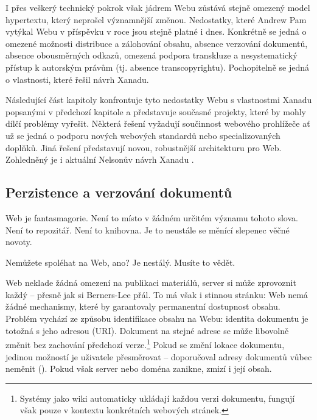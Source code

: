 I přes veškerý technický pokrok však jádrem Webu zůstává stejně omezený model hypertextu, který neprošel významnější změnou. Nedostatky, které Andrew Pam vytýkal Webu v příspěvku  v roce \cite*{Pam1995} jsou stejně platné i dnes. Konkrétně se jedná o omezené možnosti distribuce a zálohování obsahu, absence verzování dokumentů, absence obousměrných odkazů, omezená podpora transkluze a nesystematický přístup k autorským právům (tj. absence transcopyrightu). Pochopitelně se jedná o vlastnosti, které řešil návrh Xanadu.

Následující část kapitoly konfrontuje tyto nedostatky Webu s vlastnostmi Xanadu popsanými v předchozí kapitole  a představuje současné projekty, které by mohly dílčí problémy vyřešit. Některá řešení vyžadují součinnost webového prohlížeče ať už se jedná o podporu nových webových standardů nebo specializovaných doplňků. Jiná řešení představují novou, robustnější architekturu pro Web. Zohledněný je i aktuální Nelsonův návrh Xanadu .

\subsection{Perzistence a verzování dokumentů}

\begin{quoted}{\autocite{LaFrance2015}}
Web \textelp{} je fantasmagorie. Není to místo v žádném určitém významu tohoto slova. Není to repozitář. Není to knihovna. Je to neustále se měnící slepenec věčné novoty.

Nemůžete spoléhat na Web, ano? Je nestálý. Musíte to vědět.
\end{quoted}

Web neklade žádná omezení na publikaci materiálů, server si může zprovoznit každý -- přesně jak si Berners-Lee přál. To má však i stinnou stránku: Web nemá žádné mechanismy, které by garantovaly permanentní dostupnost obsahu. Problém vychází ze způsobu identifikace obsahu na Webu: identita dokumentu je totožná s jeho adresou (URI). Dokument na stejné adrese se může libovolně změnit bez zachování předchozí verze.\footnote{Systémy jako wiki automaticky ukládají každou verzi dokumentu, fungují však pouze v kontextu konkrétních webových stránek.} Pokud se změní lokace dokumentu, jedinou možností je uživatele přesměrovat -- \textcite{CoolUris} doporučoval adresy dokumentů vůbec neměnit (). Pokud však server nebo doména zanikne, zmizí i její obsah.

